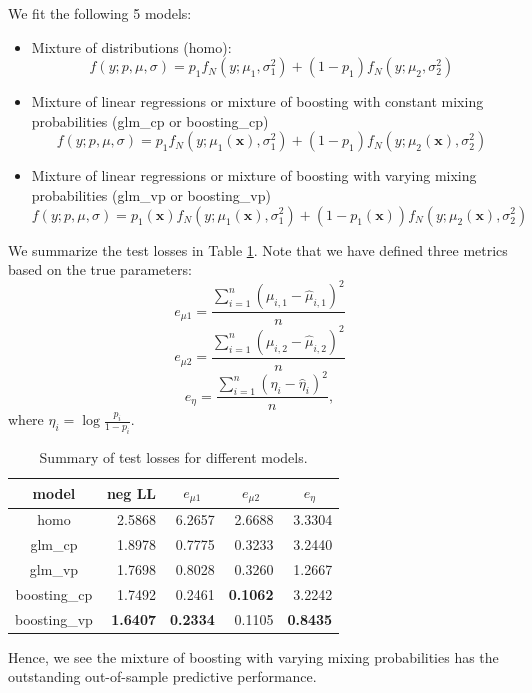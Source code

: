 \documentclass[11pt]{article}
\numberwithin{equation}{section}
\def\bx{\boldsymbol{x}}
\begin{document}
We fit the following 5 models:
\begin{itemize}
	\item 	Mixture of distributions (homo):
	$$f(y;p,\mu,\sigma)=p_1f_N(y;\mu_1,\sigma_1^2)+(1-p_1)f_N(y;\mu_2,\sigma_2^2)$$
	\item 	Mixture of linear regressions or mixture of boosting with {constant} mixing probabilities (glm\_cp or boosting\_cp)
	$$f(y;p,\mu,\sigma)=p_1f_N(y;\mu_1(\bx),\sigma_1^2)+(1-p_1)f_N(y;\mu_2(\bx),\sigma_2^2)$$
	\item 	Mixture of linear regressions or mixture of boosting with {varying} mixing probabilities (glm\_vp or boosting\_vp)
	$$f(y;p,\mu,\sigma)=p_1(\bx)f_N(y;\mu_1(\bx),\sigma_1^2)+(1-p_1(\bx))f_N(y;\mu_2(\bx),\sigma_2^2)$$
\end{itemize}
We summarize the test losses in Table \ref{gaussian-summary}. Note that we have defined three metrics based on the true parameters: 
	$$e_{\mu 1}=\frac{\sum_{i=1}^{n}(\mu_{i,1}-\hat{\mu}_{i,1})^2}{n}$$
	$$e_{\mu 2}=\frac{\sum_{i=1}^{n}(\mu_{i,2}-\hat{\mu}_{i,2})^2}{n}$$
	$$e_{\eta}=\frac{\sum_{i=1}^{n}(\eta_{i}-\hat{\eta}_{i})^2}{n},$$
	where $\eta_i=\log\frac{p_i}{1-p_i}$.
	\begin{table}[htp!]
		\centering
		\caption{Summary of test losses for different models.}\label{gaussian-summary}
		\begin{tabular}{c|rrrr}
			\hline
			model        & \multicolumn{1}{c}{neg LL} & \multicolumn{1}{c}{$e_{\mu 1}$} & \multicolumn{1}{c}{$e_{\mu 2}$} & \multicolumn{1}{c}{$e_{\eta}$} \\ \hline
			homo         & 2.5868                   & 6.2657                         & 2.6688                        & 3.3304                             \\
			glm\_cp      & 1.8978                   & 0.7775                         & 0.3233                         & 3.2440                             \\
			glm\_vp      & 1.7698                   & 0.8028                         & 0.3260                         & 1.2667                             \\
			boosting\_cp & 1.7492                   & 0.2461                         & {\bf 0.1062}                        & 3.2242                             \\
			boosting\_vp & {\bf 1.6407}                  & {\bf 0.2334}                         & 0.1105                         & {\bf 0.8435}                             \\ \hline
		\end{tabular}
	\end{table}
Hence, we see the mixture of boosting with varying mixing probabilities has the outstanding out-of-sample predictive performance.
\end{document}
